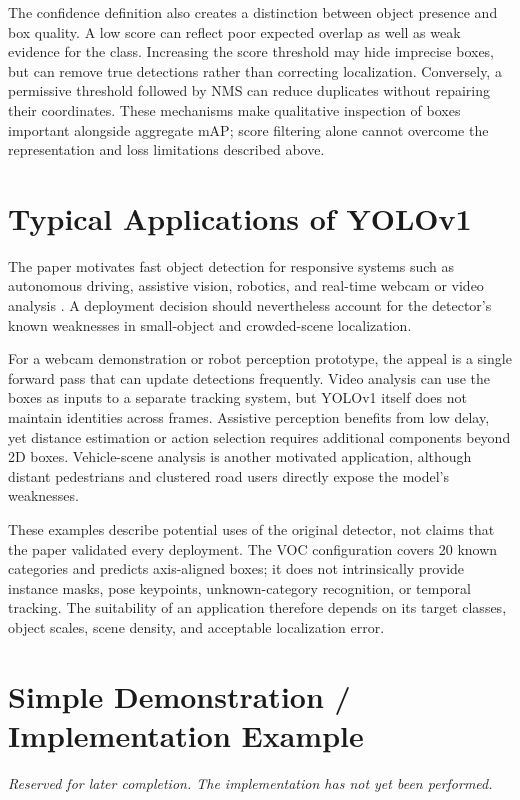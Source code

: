 \documentclass[11pt,a4paper]{article}
\begin{document}
The confidence definition also creates a distinction between object presence and box quality. A low score can reflect poor expected overlap as well as weak evidence for the class. Increasing the score threshold may hide imprecise boxes, but can remove true detections rather than correcting localization. Conversely, a permissive threshold followed by NMS can reduce duplicates without repairing their coordinates. These mechanisms make qualitative inspection of boxes important alongside aggregate mAP; score filtering alone cannot overcome the representation and loss limitations described above.

\section{Typical Applications of YOLOv1}
\label{sec:applications}
The paper motivates fast object detection for responsive systems such as autonomous driving, assistive vision, robotics, and real-time webcam or video analysis \cite{redmon2016yolo}. A deployment decision should nevertheless account for the detector's known weaknesses in small-object and crowded-scene localization.

For a webcam demonstration or robot perception prototype, the appeal is a single forward pass that can update detections frequently. Video analysis can use the boxes as inputs to a separate tracking system, but YOLOv1 itself does not maintain identities across frames. Assistive perception benefits from low delay, yet distance estimation or action selection requires additional components beyond 2D boxes. Vehicle-scene analysis is another motivated application, although distant pedestrians and clustered road users directly expose the model's weaknesses.

These examples describe potential uses of the original detector, not claims that the paper validated every deployment. The VOC configuration covers 20 known categories and predicts axis-aligned boxes; it does not intrinsically provide instance masks, pose keypoints, unknown-category recognition, or temporal tracking. The suitability of an application therefore depends on its target classes, object scales, scene density, and acceptable localization error.

\section{Simple Demonstration / Implementation Example}
\label{sec:demo}
\noindent\textit{Reserved for later completion. The implementation has not yet been performed.}
\end{document}
